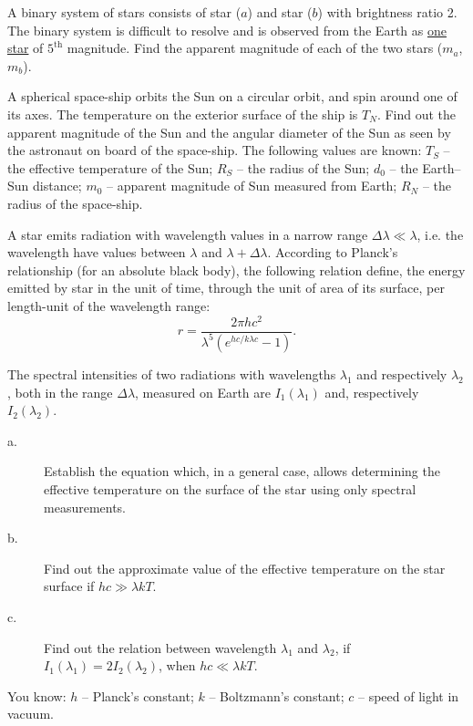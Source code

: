 A binary system of stars consists of star ($a$) and star ($b$) with
brightness ratio 2. The binary system is difficult to resolve and is
observed from the Earth as \underline{one star} of $5^{\mathrm{th}}$
magnitude. Find the apparent magnitude of each of the two stars
($m_a$, $m_b$).

A spherical space-ship orbits the Sun on a circular orbit, and spin around
one of its axes. The temperature on the exterior surface of the ship is
$T_N$. Find out the apparent magnitude of the Sun and the angular diameter
of the Sun as seen by the astronaut on board of the space-ship. The
following values are known: $T_S$ -- the effective temperature of the Sun;
$R_S$ -- the radius of the Sun; $d_0$ -- the Earth--Sun distance; $m_0$ --
apparent magnitude of Sun measured from Earth; $R_N$ -- the radius of the
space-ship.

A star emits radiation with wavelength values in a narrow range
$\Delta\lambda \ll \lambda$, i.e. the wavelength have values between
$\lambda$ and $\lambda + \Delta\lambda$. %
According to Planck's relationship
(for an absolute black body), the following relation define, the energy
emitted by star in the unit of time, through the unit of area of its
surface, per length-unit of the wavelength range:
\[ r = \frac{2\pi h c^2}{\lambda^5\left(e^{hc/k\lambda c} - 1\right)}. \]

The spectral intensities of two radiations with wavelengths $\lambda_1$ and
respectively $\lambda_2$, both in the range $\Delta\lambda$, measured on
Earth are $I_1(\lambda_1)$ and, respectively $I_2(\lambda_2)$.
\begin{description}
\item[a.] Establish the equation which, in a general case, allows
  determining the effective temperature on the surface of the star using
  only spectral measurements.
\item[b.] Find out the approximate value of the effective temperature on the
  star surface if $hc \gg \lambda k T$.
\item[c.] Find out the relation between wavelength $\lambda_1$ and
  $\lambda_2$, if $I_1(\lambda_1) = 2 I_2(\lambda_2)$, when
  $hc \ll \lambda k T$.
\end{description}
You know: $h$ -- Planck's constant; $k$ -- Boltzmann's constant; $c$ --
speed of light in vacuum.

